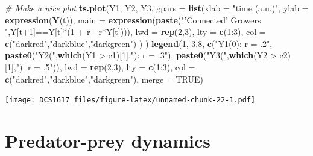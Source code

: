 \documentclass[]{book}
\newenvironment{Shaded}{\begin{snugshade}}{\end{snugshade}}
\newcommand{\KeywordTok}[1]{\textcolor[rgb]{0.13,0.29,0.53}{\textbf{{#1}}}}
\newcommand{\DataTypeTok}[1]{\textcolor[rgb]{0.13,0.29,0.53}{{#1}}}
\newcommand{\DecValTok}[1]{\textcolor[rgb]{0.00,0.00,0.81}{{#1}}}
\newcommand{\FloatTok}[1]{\textcolor[rgb]{0.00,0.00,0.81}{{#1}}}
\newcommand{\StringTok}[1]{\textcolor[rgb]{0.31,0.60,0.02}{{#1}}}
\newcommand{\CommentTok}[1]{\textcolor[rgb]{0.56,0.35,0.01}{\textit{{#1}}}}
\newcommand{\OtherTok}[1]{\textcolor[rgb]{0.56,0.35,0.01}{{#1}}}
\newcommand{\NormalTok}[1]{{#1}}
\let\stdsection\section
\renewcommand\section{\newpage\stdsection}
\begin{document}
\begin{Shaded}
\begin{Highlighting}[]
\CommentTok{# Make a nice plot}
\KeywordTok{ts.plot}\NormalTok{(Y1, Y2, Y3,}
        \DataTypeTok{gpars =} \KeywordTok{list}\NormalTok{(}\DataTypeTok{xlab =} \StringTok{"time (a.u.)"}\NormalTok{,}
                     \DataTypeTok{ylab =} \KeywordTok{expression}\NormalTok{(}\KeywordTok{Y}\NormalTok{(t)),}
                     \DataTypeTok{main =} \KeywordTok{expression}\NormalTok{(}\KeywordTok{paste}\NormalTok{(}\StringTok{"'Connected' Growers "}\NormalTok{,Y[t}\DecValTok{+1}\NormalTok{]==Y[t]*(}\DecValTok{1} \NormalTok{+}\StringTok{ }\NormalTok{r -}\StringTok{ }\NormalTok{r*Y[t]))),}
                     \DataTypeTok{lwd =} \KeywordTok{rep}\NormalTok{(}\DecValTok{2}\NormalTok{,}\DecValTok{3}\NormalTok{),}
                     \DataTypeTok{lty =} \KeywordTok{c}\NormalTok{(}\DecValTok{1}\NormalTok{:}\DecValTok{3}\NormalTok{),}
                     \DataTypeTok{col =} \KeywordTok{c}\NormalTok{(}\StringTok{"darkred"}\NormalTok{,}\StringTok{"darkblue"}\NormalTok{,}\StringTok{"darkgreen"}\NormalTok{)}
                     \NormalTok{)}
        \NormalTok{)}
\KeywordTok{legend}\NormalTok{(}\DecValTok{1}\NormalTok{, }\FloatTok{3.8}\NormalTok{, }\KeywordTok{c}\NormalTok{(}\StringTok{"Y1(0):  r = .2"}\NormalTok{,}
                 \KeywordTok{paste0}\NormalTok{(}\StringTok{"Y2("}\NormalTok{,}\KeywordTok{which}\NormalTok{(Y1 >}\StringTok{ }\NormalTok{c1)[}\DecValTok{1}\NormalTok{],}\StringTok{"): r = .3"}\NormalTok{), }
                 \KeywordTok{paste0}\NormalTok{(}\StringTok{"Y3("}\NormalTok{,}\KeywordTok{which}\NormalTok{(Y2 >}\StringTok{ }\NormalTok{c2)[}\DecValTok{1}\NormalTok{],}\StringTok{"): r = .5"}\NormalTok{)),}
       \DataTypeTok{lwd =} \KeywordTok{rep}\NormalTok{(}\DecValTok{2}\NormalTok{,}\DecValTok{3}\NormalTok{), }\DataTypeTok{lty =} \KeywordTok{c}\NormalTok{(}\DecValTok{1}\NormalTok{:}\DecValTok{3}\NormalTok{), }\DataTypeTok{col =} \KeywordTok{c}\NormalTok{(}\StringTok{"darkred"}\NormalTok{,}\StringTok{"darkblue"}\NormalTok{,}\StringTok{"darkgreen"}\NormalTok{), }\DataTypeTok{merge =} \OtherTok{TRUE}\NormalTok{)}
\end{Highlighting}
\end{Shaded}

\texttt{[image: DCS1617\_files/figure-latex/unnamed-chunk-22-1.pdf]}

\section{\texorpdfstring{\textbf{Predator-prey
dynamics}}{Predator-prey dynamics}}\label{predator-prey-dynamics}
\end{document}
